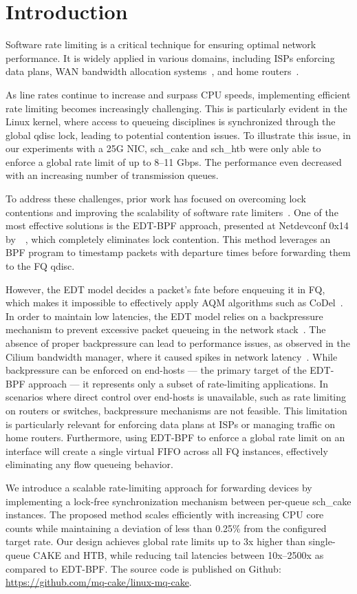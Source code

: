 \section{Introduction}

Software rate limiting is a critical technique for ensuring optimal network performance. It is widely applied in various domains, including ISPs enforcing data plans, WAN bandwidth allocation systems~\cite{bwe}, and home routers~\cite{cake}.

As line rates continue to increase and surpass CPU speeds, implementing efficient rate limiting becomes increasingly challenging. This is particularly evident in the Linux kernel, where access to queueing disciplines is synchronized through the global qdisc lock, leading to potential contention issues.
To illustrate this issue, in our experiments with a 25G NIC, sch\_cake and sch\_htb were only able to enforce a global rate limit of up to 8--11 Gbps. The performance even decreased with an increasing number of transmission queues.

To address these challenges, prior work has focused on overcoming lock contentions and improving the scalability of software rate limiters~\cite{eyeq, carousel, edt-ebpf}. One of the most effective solutions is the EDT-BPF approach, presented at Netdevconf 0x14 by~\citeauthor{edt-ebpf}~\cite{edt-ebpf}, which completely eliminates lock contention. This method leverages an BPF program to timestamp packets with departure times before forwarding them to the FQ qdisc.

However, the EDT model decides a packet's fate before enqueuing it in FQ, which makes it impossible to effectively apply AQM algorithms such as CoDel~\cite{codel}.
In order to maintain low latencies, the EDT model relies on a backpressure mechanism to prevent excessive packet queueing in the network stack~\cite{carousel}. The absence of proper backpressure can lead to performance issues, as observed in the Cilium bandwidth manager, where it caused spikes in network latency~\cite{edt-issue, fifo-in-the-cloud}. While backpressure can be enforced on end-hosts --- the primary target of the EDT-BPF approach --- it represents only a subset of rate-limiting applications.
In scenarios where direct control over end-hosts is unavailable, such as rate limiting on routers or switches, backpressure mechanisms are not feasible. This limitation is particularly relevant for enforcing data plans at ISPs or managing traffic on home routers.
Furthermore, using EDT-BPF to enforce a global rate limit on an interface will create a single virtual FIFO across all FQ instances, effectively eliminating any flow queueing behavior.

We introduce a scalable rate-limiting approach for forwarding devices by implementing a lock-free synchronization mechanism between per-queue sch\_cake instances. The proposed method scales efficiently with increasing CPU core counts while maintaining a deviation of less than 0.25\% from the configured target rate.
Our design achieves global rate limits up to 3x higher than single-queue CAKE and HTB, while reducing tail latencies between 10x--2500x as compared to EDT-BPF.
The source code is published on Github: \url{https://github.com/mq-cake/linux-mq-cake}.
